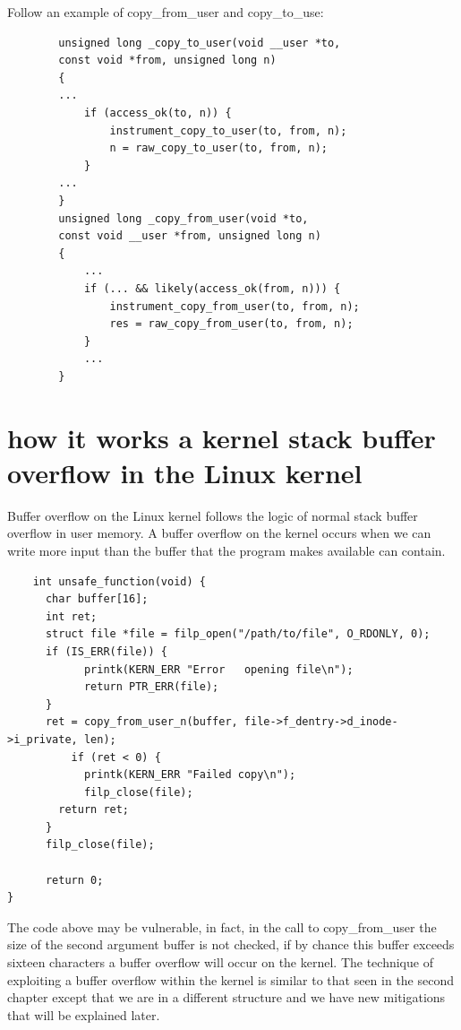     Follow an example of copy\_from\_user and copy\_to\_use:\newline
    \begin{verbatim}
        unsigned long _copy_to_user(void __user *to, 
        const void *from, unsigned long n) 
        { 
        ... 
            if (access_ok(to, n)) { 
                instrument_copy_to_user(to, from, n); 
                n = raw_copy_to_user(to, from, n); 
            } 
        ... 
        } 
        unsigned long _copy_from_user(void *to, 
        const void __user *from, unsigned long n) 
        { 
            ... 
            if (... && likely(access_ok(from, n))) { 
                instrument_copy_from_user(to, from, n); 
                res = raw_copy_from_user(to, from, n); 
            } 
            ... 
        } 
    \end{verbatim}
    \section{how it works a kernel stack buffer overflow in the Linux kernel}
    Buffer overflow on the Linux kernel follows the logic of normal stack buffer overflow in user memory.
    A buffer overflow on the kernel occurs when we can write more input than the buffer that the program makes available can contain.\newline    
    \begin{verbatim}
    int unsafe_function(void) {
      char buffer[16];
      int ret;
      struct file *file = filp_open("/path/to/file", O_RDONLY, 0);
      if (IS_ERR(file)) {
            printk(KERN_ERR "Error   opening file\n");
            return PTR_ERR(file);
      }
      ret = copy_from_user_n(buffer, file->f_dentry->d_inode->i_private, len);
          if (ret < 0) {
            printk(KERN_ERR "Failed copy\n");
            filp_close(file);
        return ret;
      } 
      filp_close(file);
    
      return 0;
}    
    \end{verbatim}
    The code above may be vulnerable, in fact, in the call to copy\_from\_user the size of the second argument buffer is not checked, if by chance this buffer exceeds sixteen characters a buffer overflow will occur on the kernel.\newline
    The technique of exploiting a buffer overflow within the kernel is similar to that seen in the second chapter except that we are in a different structure and we have new mitigations that will be explained later.\newline
    \clearpage
